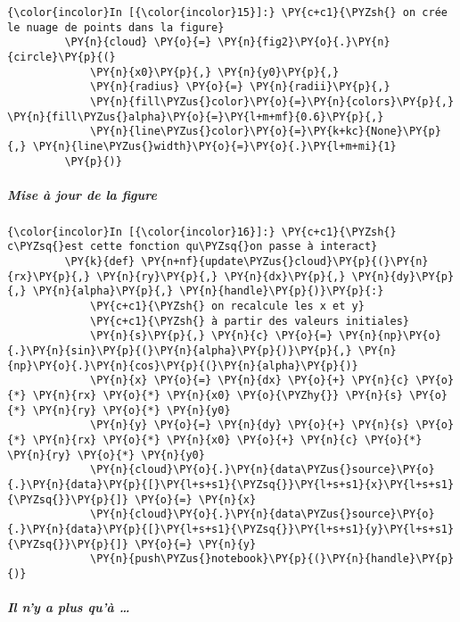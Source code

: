     \begin{Verbatim}[commandchars=\\\{\}]
{\color{incolor}In [{\color{incolor}15}]:} \PY{c+c1}{\PYZsh{} on crée le nuage de points dans la figure}
         \PY{n}{cloud} \PY{o}{=} \PY{n}{fig2}\PY{o}{.}\PY{n}{circle}\PY{p}{(}
             \PY{n}{x0}\PY{p}{,} \PY{n}{y0}\PY{p}{,}
             \PY{n}{radius} \PY{o}{=} \PY{n}{radii}\PY{p}{,}
             \PY{n}{fill\PYZus{}color}\PY{o}{=}\PY{n}{colors}\PY{p}{,} \PY{n}{fill\PYZus{}alpha}\PY{o}{=}\PY{l+m+mf}{0.6}\PY{p}{,}
             \PY{n}{line\PYZus{}color}\PY{o}{=}\PY{k+kc}{None}\PY{p}{,} \PY{n}{line\PYZus{}width}\PY{o}{=}\PY{o}{.}\PY{l+m+mi}{1}
         \PY{p}{)}
\end{Verbatim}


    \hypertarget{mise-uxe0-jour-de-la-figure}{%
\subparagraph{Mise à jour de la
figure}\label{mise-uxe0-jour-de-la-figure}}

    \begin{Verbatim}[commandchars=\\\{\}]
{\color{incolor}In [{\color{incolor}16}]:} \PY{c+c1}{\PYZsh{} c\PYZsq{}est cette fonction qu\PYZsq{}on passe à interact}
         \PY{k}{def} \PY{n+nf}{update\PYZus{}cloud}\PY{p}{(}\PY{n}{rx}\PY{p}{,} \PY{n}{ry}\PY{p}{,} \PY{n}{dx}\PY{p}{,} \PY{n}{dy}\PY{p}{,} \PY{n}{alpha}\PY{p}{,} \PY{n}{handle}\PY{p}{)}\PY{p}{:}
             \PY{c+c1}{\PYZsh{} on recalcule les x et y}
             \PY{c+c1}{\PYZsh{} à partir des valeurs initiales}
             \PY{n}{s}\PY{p}{,} \PY{n}{c} \PY{o}{=} \PY{n}{np}\PY{o}{.}\PY{n}{sin}\PY{p}{(}\PY{n}{alpha}\PY{p}{)}\PY{p}{,} \PY{n}{np}\PY{o}{.}\PY{n}{cos}\PY{p}{(}\PY{n}{alpha}\PY{p}{)}
             \PY{n}{x} \PY{o}{=} \PY{n}{dx} \PY{o}{+} \PY{n}{c} \PY{o}{*} \PY{n}{rx} \PY{o}{*} \PY{n}{x0} \PY{o}{\PYZhy{}} \PY{n}{s} \PY{o}{*} \PY{n}{ry} \PY{o}{*} \PY{n}{y0}
             \PY{n}{y} \PY{o}{=} \PY{n}{dy} \PY{o}{+} \PY{n}{s} \PY{o}{*} \PY{n}{rx} \PY{o}{*} \PY{n}{x0} \PY{o}{+} \PY{n}{c} \PY{o}{*} \PY{n}{ry} \PY{o}{*} \PY{n}{y0}
             \PY{n}{cloud}\PY{o}{.}\PY{n}{data\PYZus{}source}\PY{o}{.}\PY{n}{data}\PY{p}{[}\PY{l+s+s1}{\PYZsq{}}\PY{l+s+s1}{x}\PY{l+s+s1}{\PYZsq{}}\PY{p}{]} \PY{o}{=} \PY{n}{x}
             \PY{n}{cloud}\PY{o}{.}\PY{n}{data\PYZus{}source}\PY{o}{.}\PY{n}{data}\PY{p}{[}\PY{l+s+s1}{\PYZsq{}}\PY{l+s+s1}{y}\PY{l+s+s1}{\PYZsq{}}\PY{p}{]} \PY{o}{=} \PY{n}{y}
             \PY{n}{push\PYZus{}notebook}\PY{p}{(}\PY{n}{handle}\PY{p}{)}
\end{Verbatim}


    \hypertarget{il-ny-a-plus-quuxe0}{%
\subparagraph{Il n'y a plus qu'à \ldots{}}\label{il-ny-a-plus-quuxe0}}

